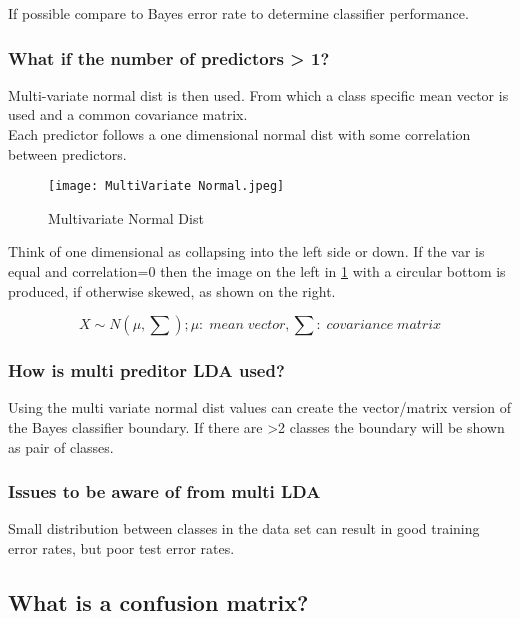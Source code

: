 \documentclass[11pt]{scrartcl} %
\begin{document}
If possible compare to Bayes error rate to determine classifier performance.

\subsubsection{What if the number of predictors > 1?}

Multi-variate normal dist is then used. From which a class specific mean vector is used and a common covariance matrix.\\

Each predictor follows a one dimensional normal dist with some correlation between predictors.

\begin{figure}[h] %
	\centering
	\texttt{[image: MultiVariate Normal.jpeg]} %
	\caption{Multivariate Normal Dist}
	\label{multi-normal}
\end{figure}

Think of one dimensional as collapsing into the left side or down. If the var is equal and correlation=0
then the image on the left in \ref{multi-normal} with a circular bottom is produced, if otherwise skewed,
as shown on the right.

\begin{equation}
	X \sim N(\mu,\sum); \mu:\; mean\; vector, \sum:\; covariance\; matrix
\end{equation}

\subsubsection{How is multi preditor LDA used?}

Using the multi variate normal dist values can create the vector/matrix version of the Bayes 
classifier boundary. If there are >2 classes the boundary will be shown as pair of classes.

\subsubsection{Issues to be aware of from multi LDA}

Small distribution between classes in the data set can result in good training error rates, but 
poor test error rates.

\subsection{What is a confusion matrix?}
\end{document}
